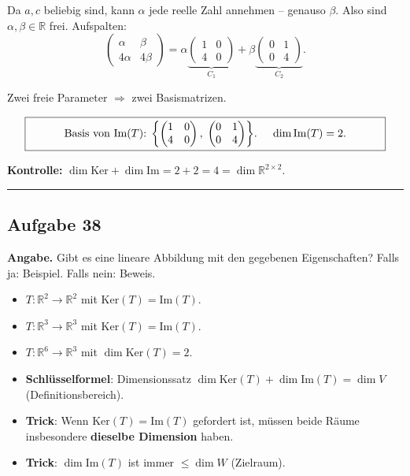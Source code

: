 \documentclass[a4paper,12pt]{article}
\begin{document}
Da $a, c$ beliebig sind, kann $\alpha$ jede reelle Zahl annehmen -- genauso $\beta$. Also sind $\alpha, \beta \in \mathbb{R}$ frei. Aufspalten:
\[
\begin{pmatrix} \alpha & \beta \\ 4\alpha & 4\beta \end{pmatrix}
= \alpha \underbrace{\begin{pmatrix} 1 & 0 \\ 4 & 0 \end{pmatrix}}_{C_1}
+ \beta \underbrace{\begin{pmatrix} 0 & 1 \\ 0 & 4 \end{pmatrix}}_{C_2}.
\]

Zwei freie Parameter $\Rightarrow$ zwei Basismatrizen.

\[
\fbox{\parbox{0.93\textwidth}{\centering
Basis von $\text{Im}(T)$: $\left\{\begin{pmatrix} 1 & 0 \\ 4 & 0 \end{pmatrix},\; \begin{pmatrix} 0 & 1 \\ 0 & 4 \end{pmatrix}\right\}$. \quad $\dim \text{Im}(T) = 2$.
}}
\]

\textbf{Kontrolle:} $\dim \text{Ker} + \dim \text{Im} = 2 + 2 = 4 = \dim \mathbb{R}^{2 \times 2}$. \checkmark

\bigskip
\hrule
\bigskip

\subsection*{Aufgabe 38}

\textbf{Angabe.} Gibt es eine lineare Abbildung mit den gegebenen Eigenschaften? Falls ja: Beispiel. Falls nein: Beweis.
\begin{itemize}[nosep]
\item[(a)] $T \colon \mathbb{R}^2 \to \mathbb{R}^2$ mit $\text{Ker}(T) = \text{Im}(T)$.
\item[(b)] $T \colon \mathbb{R}^3 \to \mathbb{R}^3$ mit $\text{Ker}(T) = \text{Im}(T)$.
\item[(c)] $T \colon \mathbb{R}^6 \to \mathbb{R}^3$ mit $\dim \text{Ker}(T) = 2$.
\end{itemize}

\begin{begriffe}
\begin{itemize}[leftmargin=*, nosep]
    \item \textbf{Schl\"usselformel}: Dimensionssatz $\dim \text{Ker}(T) + \dim \text{Im}(T) = \dim V$ (Definitionsbereich).
    \item \textbf{Trick}: Wenn $\text{Ker}(T) = \text{Im}(T)$ gefordert ist, m\"ussen beide R\"aume insbesondere \textbf{dieselbe Dimension} haben.
    \item \textbf{Trick}: $\dim \text{Im}(T)$ ist immer $\leq \dim W$ (Zielraum).
\end{itemize}
\end{begriffe}
\end{document}
